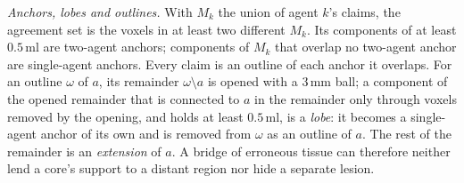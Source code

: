 \documentclass[fleqn,10pt]{olplainarticle}
\begin{document}
\emph{Anchors, lobes and outlines.} With $M_k$ the union of agent $k$'s claims, the agreement set is the voxels in at least
two different $M_k$. Its components of at least $0.5$\,ml are two-agent anchors; components of $M_k$ that overlap no
two-agent anchor are single-agent anchors. Every claim is an outline of each anchor it overlaps. For an outline $\omega$ of
$a$, its remainder $\omega\setminus a$ is opened with a $3$\,mm ball; a component of the opened remainder that is
connected to $a$ in the remainder only through voxels removed by the opening, and holds at least $0.5$\,ml, is a
\emph{lobe}: it becomes a single-agent anchor of its own and is removed from $\omega$ as an outline of $a$. The rest of the
remainder is an \emph{extension} of $a$. A bridge of erroneous tissue can therefore neither lend a core's support to a
distant region nor hide a separate lesion.
\end{document}
